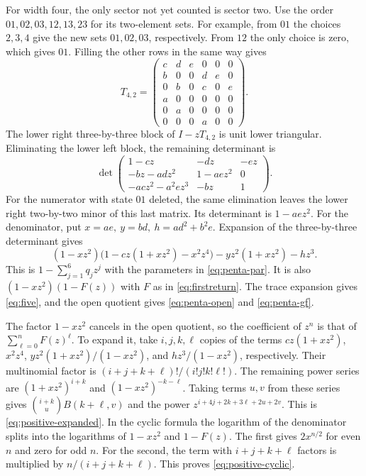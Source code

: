 \documentclass[11pt,reqno]{amsart}
\theoremstyle{remark}
\numberwithin{equation}{section}
\begin{document}
For width four, the only sector not yet counted is sector two. Use the
order \(01,02,03,12,13,23\) for its two-element sets. For example, from
\(01\) the choices \(2,3,4\) give the new sets \(01,02,03\),
respectively. From \(12\) the only choice is zero, which gives \(01\).
Filling the other rows in the same way gives
\[
 T_{4,2}=
 \begin{pmatrix}
 c&d&e&0&0&0\\
 b&0&0&d&e&0\\
 0&b&0&c&0&e\\
 a&0&0&0&0&0\\
 0&a&0&0&0&0\\
 0&0&0&a&0&0
 \end{pmatrix}.
\]
The lower right three-by-three block of \(I-zT_{4,2}\) is unit lower
triangular. Eliminating the lower left block, the remaining determinant
is
\[
 \det\begin{pmatrix}
 1-cz&-dz&-ez\\
 -bz-adz^2&1-aez^2&0\\
 -acz^2-a^2ez^3&-bz&1
 \end{pmatrix}.
\]
For the numerator with state \(01\) deleted, the same elimination leaves
the lower right two-by-two minor of this last matrix. Its determinant is
\(1-aez^2\). For the denominator, put \(x=ae,\ y=bd,\ h=ad^2+b^2e\).
Expansion of the three-by-three determinant gives
\[
 (1-xz^2)\bigl(1-cz(1+xz^2)-x^2z^4\bigr)
                -yz^2(1+xz^2)-hz^3.
\]
This is \(1-\sum_{j=1}^6q_jz^j\) with the parameters in
\eqref{eq:penta-par}. It is also \((1-xz^2)(1-F(z))\) with \(F\) as in
\eqref{eq:firstreturn}. The trace expansion gives \eqref{eq:five}, and
the open quotient gives \eqref{eq:penta-open} and \eqref{eq:penta-gf}.

The factor \(1-xz^2\) cancels in the open quotient, so the coefficient of
\(z^n\) is that of \(\sum_{\ell=0}^n F(z)^\ell\). To expand it, take
\(i,j,k,\ell\) copies of the terms \(cz(1+xz^2)\), \(x^2z^4\),
\(yz^2(1+xz^2)/(1-xz^2)\), and \(hz^3/(1-xz^2)\), respectively. Their
multinomial factor is \((i+j+k+\ell)!/(i!j!k!\ell!)\). The remaining
power series are \((1+xz^2)^{i+k}\) and \((1-xz^2)^{-k-\ell}\). Taking
terms \(u,v\) from these series gives \(\binom{i+k}{u}B(k+\ell,v)\) and
the power \(z^{i+4j+2k+3\ell+2u+2v}\). This is
\eqref{eq:positive-expanded}. In the cyclic formula the logarithm of the
denominator splits into the logarithms of \(1-xz^2\) and \(1-F(z)\). The
first gives \(2x^{n/2}\) for even \(n\) and zero for odd \(n\). For the
second, the term with \(i+j+k+\ell\) factors is multiplied by
\(n/(i+j+k+\ell)\). This proves \eqref{eq:positive-cyclic}.
\end{document}
